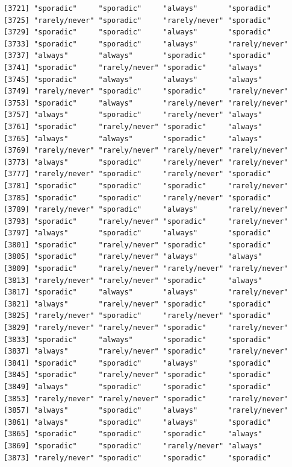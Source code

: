 \documentclass[
  letterpaper,
  DIV=11,
  numbers=noendperiod]{scrartcl}
\begin{document}
\begin{verbatim}
[3721] "sporadic"     "sporadic"     "always"       "sporadic"    
[3725] "rarely/never" "sporadic"     "rarely/never" "sporadic"    
[3729] "sporadic"     "sporadic"     "always"       "sporadic"    
[3733] "sporadic"     "sporadic"     "always"       "rarely/never"
[3737] "always"       "always"       "sporadic"     "sporadic"    
[3741] "sporadic"     "rarely/never" "sporadic"     "always"      
[3745] "sporadic"     "always"       "always"       "always"      
[3749] "rarely/never" "sporadic"     "sporadic"     "rarely/never"
[3753] "sporadic"     "always"       "rarely/never" "rarely/never"
[3757] "always"       "sporadic"     "rarely/never" "always"      
[3761] "sporadic"     "rarely/never" "sporadic"     "always"      
[3765] "always"       "always"       "sporadic"     "always"      
[3769] "rarely/never" "rarely/never" "rarely/never" "rarely/never"
[3773] "always"       "sporadic"     "rarely/never" "rarely/never"
[3777] "rarely/never" "sporadic"     "rarely/never" "sporadic"    
[3781] "sporadic"     "sporadic"     "sporadic"     "rarely/never"
[3785] "sporadic"     "sporadic"     "rarely/never" "sporadic"    
[3789] "rarely/never" "sporadic"     "always"       "rarely/never"
[3793] "sporadic"     "rarely/never" "sporadic"     "rarely/never"
[3797] "always"       "sporadic"     "always"       "sporadic"    
[3801] "sporadic"     "rarely/never" "sporadic"     "sporadic"    
[3805] "sporadic"     "rarely/never" "always"       "always"      
[3809] "sporadic"     "rarely/never" "rarely/never" "rarely/never"
[3813] "rarely/never" "rarely/never" "sporadic"     "always"      
[3817] "sporadic"     "always"       "always"       "rarely/never"
[3821] "always"       "rarely/never" "sporadic"     "sporadic"    
[3825] "rarely/never" "sporadic"     "rarely/never" "sporadic"    
[3829] "rarely/never" "rarely/never" "sporadic"     "rarely/never"
[3833] "sporadic"     "always"       "sporadic"     "sporadic"    
[3837] "always"       "rarely/never" "sporadic"     "rarely/never"
[3841] "sporadic"     "sporadic"     "always"       "sporadic"    
[3845] "sporadic"     "rarely/never" "sporadic"     "sporadic"    
[3849] "always"       "sporadic"     "sporadic"     "sporadic"    
[3853] "rarely/never" "rarely/never" "sporadic"     "rarely/never"
[3857] "always"       "sporadic"     "always"       "rarely/never"
[3861] "always"       "sporadic"     "always"       "sporadic"    
[3865] "sporadic"     "sporadic"     "sporadic"     "always"      
[3869] "sporadic"     "sporadic"     "rarely/never" "always"      
[3873] "rarely/never" "sporadic"     "sporadic"     "sporadic"    

\end{verbatim}
\end{document}
